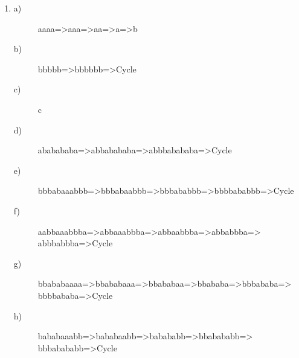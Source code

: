 \documentclass{article}
\begin{document}
\begin{enumerate}
\item 
\begin{description}
\item[a)] aaaa=>aaa=>aa=>a=>b
\item[b)] bbbbb=>bbbbbb=>Cycle
\item[c)] c
\item[d)] ababababa=>abbabababa=>abbbabababa=>Cycle
\item[e)] bbbabaaabbb=>bbbabaabbb=>bbbababbb=>bbbbababbb=>Cycle
\item[f)] aabbaaabbba=>abbaaabbba=>abbaabbba=>abbabbba=> abbbabbba=>Cycle
\item[g)] bbababaaaa=>bbababaaa=>bbababaa=>bbababa=>bbbababa=> bbbbababa=>Cycle
\item[h)] bababaaabb=>bababaabb=>babababb=>bbabababb=> bbbabababb=>Cycle
\end{description}
\end{enumerate}
\end{document}
